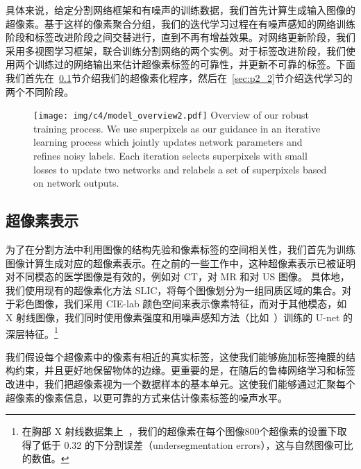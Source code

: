 具体来说，给定分割网络框架和有噪声的训练数据，我们首先计算生成输入图像的超像素。基于这样的像素聚合分组，我们的迭代学习过程在有噪声感知的网络训练阶段和标签改进阶段之间交替进行，直到不再有增益效果。对网络更新阶段，我们采用多视图学习框架，联合训练分割网络的两个实例。对于标签改进阶段，我们使用两个训练过的网络输出来估计超像素标签的可靠性，并更新不可靠的标签。下面我们首先在~\ref{sec:p2_1}节介绍我们的超像素化程序，然后在~\ref{sec:p2_2}节介绍迭代学习的两个不同阶段。

    \begin{figure}[tbp]
        \centering 
        \texttt{[image: img/c4/model\_overview2.pdf]}
        {Overview of our robust training process. We use superpixels as our guidance in an iterative learning process which jointly updates network parameters and refines noisy labels. Each iteration selects superpixels with small losses to update two networks and relabels a set of superpixels based on network outputs.} %
        \label{fig:nss_overview}
    \end{figure}


\subsection{超像素表示} \label{sec:p2_1}

为了在分割方法中利用图像的结构先验和像素标签的空间相关性，我们首先为训练图像计算生成对应的超像素表示。在之前的一些工作中，这种超像素表示已被证明对不同模态的医学图像是有效的，例如\citet{qin2018superpixel}对 CT，\citet{tian2015superpixel}对 MR 和\citet{daoud2019automatic}对 US 图像。
具体地，我们使用现有的超像素化方法 SLIC\citep{Achanta2012SLICSC}，将每个图像划分为一组同质区域的集合。对于彩色图像，我们采用 CIE-lab 颜色空间来表示像素特征，而对于其他模态，如 X 射线图像，我们同时使用像素强度和用噪声感知方法（比如~\citet{Wei2020CombatingNL}）训练的 U-net 的深层特征。\footnote{在胸部 X 射线数据集上~\cite{Shiraishi2000DevelopmentOA,Ginneken2006SegmentationOA}，我们的超像素在每个图像800个超像素的设置下取得了低于 0.32 的下分割误差（undersegmentation errors），这与自然图像可比的数值\citep{Achanta2012SLICSC}。}

我们假设每个超像素中的像素有相近的真实标签，这使我们能够施加标签掩膜的结构约束，并且更好地保留物体的边缘。更重要的是，在随后的鲁棒网络学习和标签改进中，我们把超像素视为一个数据样本的基本单元。这使我们能够通过汇聚每个超像素的像素信息，以更可靠的方式来估计像素标签的噪声水平。

